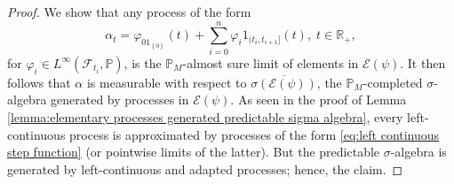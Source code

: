 \documentclass[11pt,a4paper,twoside,openany]{report}
\numberwithin{equation}{section}
\theoremstyle{plain} %
\theoremstyle{definition} %
\theoremstyle{remark} %
\begin{document}
\begin{proof}
    We show that any process of the form 
    \begin{equation}\label{eq:left continuous step function}
        \alpha_t = \varphi_01_{\left\{ 0\right\}}(t)+\sum_{i=0}^n \varphi_i1_{(t_i,t_{i+1}]}(t),\;t\in\mathbb{R}_+,
    \end{equation}
    for \(\varphi_i\in L^{\infty}(\mathcal{F}_{t_i},\mathbb{P})\), 
    is the \(\mathbb{P}_M\)-almost sure limit of elements in \(\mathcal{E}(\psi)\). It then follows that \(\alpha\) is measurable with respect to \(\overline{\sigma(\mathcal{E}(\psi))}\), the \(\mathbb{P}_M\)-completed \(\sigma\)-algebra generated by processes in \(\mathcal{E}(\psi)\). As seen in the proof of Lemma \ref{lemma:elementary processes generated predictable sigma algebra}, every left-continuous process is approximated by processes of the form \eqref{eq:left continuous step function} (or pointwise limits of the latter). But the predictable \(\sigma\)-algebra is generated by left-continuous and adapted processes; hence, the claim.




\end{proof}
\end{document}
